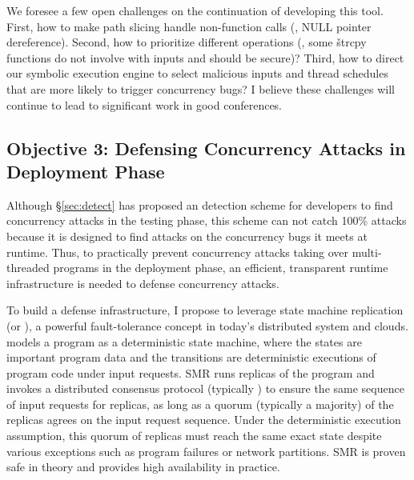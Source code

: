 

We foresee a few open challenges on the continuation of developing this tool. 
First, how to make path slicing handle non-function calls (\eg, NULL pointer 
dereference). Second, how to prioritize different operations (\eg, some 
\v{strcpy} functions do not involve with inputs and should be secure)? Third, 
how to direct our symbolic execution engine to select malicious inputs and 
thread schedules that are more likely to trigger concurrency bugs? I believe 
these challenges will continue to lead to significant work in good conferences.

\vspace{-.15in}\subsection{Objective 3: Defensing Concurrency Attacks in Deployment Phase} 
\label{sec:defense}\vspace{-.075in}

Although \S\ref{sec:detect} has proposed an detection scheme for developers to 
find concurrency attacks in the testing phase, this scheme can not catch 100\% 
attacks because it is designed to find attacks on the concurrency bugs it meets 
at runtime. Thus, to practically prevent concurrency attacks taking over 
multi-threaded programs in the deployment phase, an efficient, transparent 
runtime infrastructure is needed to defense concurrency attacks.

To build a defense infrastructure, I propose to leverage state machine 
replication (or \smr), a powerful fault-tolerance concept in today's 
distributed system and clouds. \smr models a program as a deterministic
state machine, where the states are important program data and the transitions 
are deterministic executions of program code under input requests. SMR runs 
replicas of the program and invokes a distributed consensus protocol 
(typically \paxos) to ensure the same sequence of input requests for replicas, 
as long as a quorum (typically a majority) of the replicas agrees on the input 
request sequence. Under the deterministic execution assumption, this quorum of 
replicas must reach the same exact state despite various exceptions such as 
program failures or network partitions. SMR is proven safe in theory and 
provides high availability in practice.

